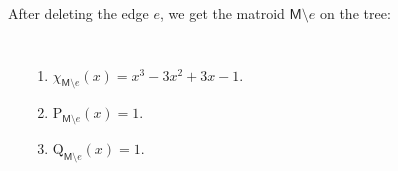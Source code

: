 \documentclass[final]{beamer}
\newlength{\onecolwid}
\newlength{\twocolwid}
\newcommand{\M}{\mathsf{M}}
\begin{document}
\begin{frame}[t]
\begin{columns}[t]
\begin{column}{\onecolwid}
\begin{columns}[t]
\end{columns}
\vspace{5mm}
After deleting the edge \(e\), we get the matroid
\(\M\setminus e\) on the tree:
\vspace{-10mm}
\begin{columns}[t]
    \begin{center}
    \end{center}
    \begin{enumerate}
        \item $\chi_{\M\setminus e}(x) = x^3 - 3x^2 + 3x - 1$.
        \item $\mathrm{P}_{\M\setminus e}(x) = 1$.
        \item $\mathrm{Q}_{\M\setminus e}(x) = 1$.
    \end{enumerate}
\end{columns}
\end{column} %






\begin{column}{\twocolwid} %


\end{column}
\end{columns}
\end{frame}
\end{document}
